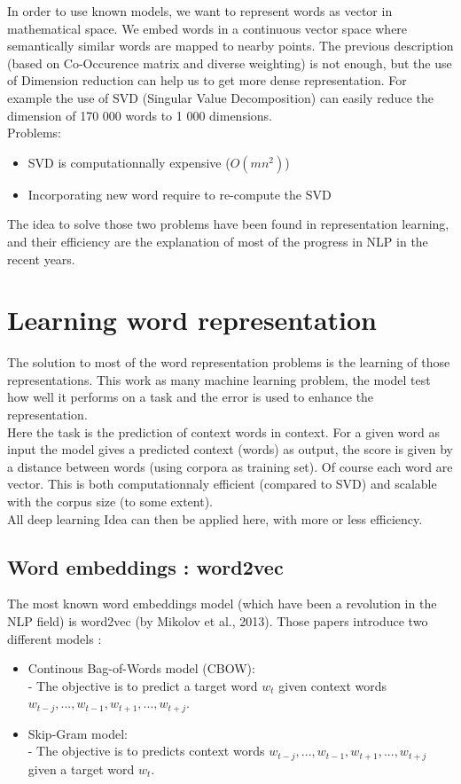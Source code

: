			In order to use known models, we want to represent words as vector in mathematical space. We embed words in a continuous vector space where semantically similar words are mapped to nearby points. The previous description (based on Co-Occurence matrix and diverse weighting) is not enough, but the use of Dimension reduction can help us to get more dense representation. For example the use of SVD (Singular Value Decomposition) can easily reduce the dimension of 170 000 words to 1 000 dimensions. \\
			Problems:
			\begin{itemize}
				\item SVD is computationnally expensive ($O(mn^2)$)
				\item Incorporating new word require to re-compute the SVD
			\end{itemize}

			The idea to solve those two problems have been found in representation learning, and their efficiency are the explanation of most of the progress in NLP in the recent years. 

	\section{Learning word representation}

		The solution to most of the word representation problems is the learning of those representations. This work as many machine learning problem, the model test how well it performs on a task and the error is used to enhance the representation. \\
		Here the task is the prediction of context words in context. For a given word as input the model gives a predicted context (words) as output, the score is given by a distance between words (using corpora as training set). Of course each word are vector. This is both computationnaly efficient (compared to SVD) and scalable with the corpus size (to some extent).\\
		All deep learning Idea can then be applied here, with more or less efficiency.

		\subsection{Word embeddings : word2vec}

			The most known word embeddings model (which have been a revolution in the NLP field) is word2vec (by Mikolov et al., 2013). Those papers  introduce two different models :
			\begin{itemize}
				\item Continous Bag-of-Words model (CBOW):\\
				- The objective is to predict a target word $w_t$ given context words $w_{t-j}, ..., w_{t-1}, w_{t+1}, ..., w_{t+j}$.
				\item Skip-Gram model:\\
				- The objective is to predicts context words  $w_{t-j}, ..., w_{t-1}, w_{t+1}, ..., w_{t+j}$ given a target word $w_t$.
			\end{itemize}
  
